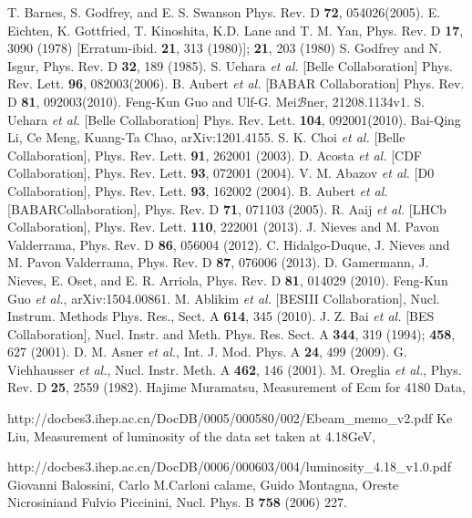 \documentclass[aps,preprint,tightenlines,superscriptaddress,showpacs,byrevtex,amsmath,amssymb,nofloatfix]{revtex4}
\def\Journal#1#2#3#4{{#1} {\bf #2}, #3 (#4)}
\def\IJMP{Int. J. Mod. Phys. A}
\def\PRD{Phys. Rev. D}
\begin{document}
\begin{thebibliography}{**}
 T. Barnes, S. Godfrey, and E. S. Swanson Phys. Rev. D {\bf 72}, 054026(2005).
 E. Eichten, K. Gottfried, T. Kinoshita, K.D. Lane and T. M. Yan, Phys. Rev. D {\bf 17}, 3090 (1978) [Erratum-ibid. {\bf 21}, 313 (1980)]; {\bf 21}, 203 (1980)
 S. Godfrey and N. Isgur, Phys. Rev. D {\bf 32}, 189 (1985).
 S. Uehara {\em et al.} [Belle Collaboration] Phys. Rev. Lett. {\bf 96}, 082003(2006).
 B. Aubert {\em et al.} [BABAR Collaboration] Phys. Rev. D {\bf 81}, 092003(2010).
 Feng-Kun Guo and Ulf-G. Mei$\mathcal{B}$ner, 21208.1134v1.
 S. Uehara {\em et al.} [Belle Collaboration] Phys. Rev. Lett. {\bf 104}, 092001(2010).
 Bai-Qing Li, Ce Meng, Kuang-Ta Chao, arXiv:1201.4155.
 S. K. Choi {\em et al.} [Belle Collaboration], Phys. Rev. Lett. {\bf 91}, 262001 (2003).
 D. Acosta {\em et al.} [CDF Collaboration], Phys. Rev. Lett. {\bf 93}, 072001 (2004).
 V. M. Abazov {\em et al.} [D0 Collaboration], Phys. Rev. Lett. {\bf 93}, 162002 (2004).
 B. Aubert {\em et al.} [BABARCollaboration], Phys. Rev. D {\bf 71}, 071103 (2005).
 R. Aaij {\em et al.} [LHCb Collaboration], Phys. Rev. Lett. {\bf 110}, 222001 (2013).
 J. Nieves and M. Pavon Valderrama, Phys. Rev. D {\bf 86}, 056004 (2012).
 C. Hidalgo-Duque, J. Nieves and M. Pavon Valderrama, Phys. Rev. D {\bf 87}, 076006 (2013).
 D. Gamermann, J. Nieves, E. Oset, and E. R. Arriola, Phys. Rev. D {\bf 81}, 014029 (2010).
 Feng-Kun Guo {\em et al.}, arXiv:1504.00861.
 M. Ablikim {\em et al.} [BESIII Collaboration], Nucl. Instrum. Methods Phys. Res., Sect. A {\bf 614}, 345 (2010).
 J. Z. Bai {\em et al.} [BES Collaboration], Nucl. Instr. and Meth. Phys. Res. Sect. A {\bf 344}, 319 (1994); {\bf 458}, 627 (2001).
 D. M. Asner {\em et al.}, \Journal\IJMP{24}{499}{2009}.
 G. Viehhausser {\em et al.}, Nucl. Instr. Meth. A {\bf 462}, 146 (2001).
 M. Oreglia {\em et al.}, \Journal\PRD{25}{2559}{1982}.
 Hajime Muramatsu, Measurement of Ecm for 4180 Data, \par  http://docbes3.ihep.ac.cn/DocDB/0005/000580/002/Ebeam\_memo\_v2.pdf
 Ke Liu, Measurement of luminosity of the data set taken at 4.18GeV, \par http://docbes3.ihep.ac.cn/DocDB/0006/000603/004/luminosity\_4.18\_v1.0.pdf
 Giovanni Balossini, Carlo M.Carloni calame, Guido Montagna, Oreste Nicrosiniand Fulvio Piccinini, Nucl. Phys. B {\bf 758} (2006) 227.


\end{thebibliography}
\end{document}
